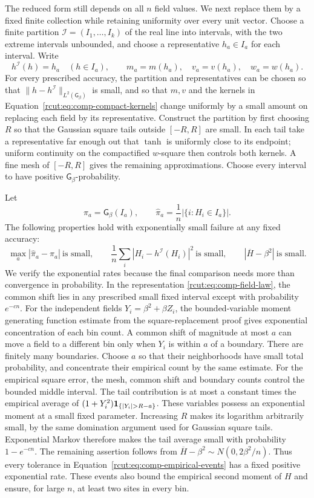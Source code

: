 The reduced form still depends on all $n$ field values.  We next
replace them by a fixed finite collection while retaining uniformity
over every unit vector.  Choose a finite partition
$\mathcal I=(I_1,\ldots,I_k)$ of the real line into intervals, with
the two extreme intervals unbounded, and choose a representative
$h_a\in I_a$ for each interval.  Write
\[
 h^{\mathcal I}(h)=h_a\quad(h\in I_a),\qquad
 m_a=m(h_a),\quad v_a=v(h_a),\quad w_a=w(h_a).
\]
For every prescribed accuracy, the partition and representatives can
be chosen so that $\|h-h^{\mathcal I}\|_{L^2(\mathsf G_\beta)}$ is
small, and so that $m,v$ and the kernels in
Equation~\eqref{rcut:eq:comp-compact-kernels} change uniformly by a
small amount on replacing each field by its representative.
Construct the partition by first choosing $R$ so that the Gaussian
square tails outside $[-R,R]$ are small.  In each tail take a
representative far enough out that $\tanh$ is uniformly close to its
endpoint; uniform continuity on the compactified $w$-square then
controls both kernels.  A fine mesh of $[-R,R]$ gives the remaining
approximations.  Choose every interval to have positive
$\mathsf G_\beta$-probability.

Let
\[
 \pi_a=\mathsf G_\beta(I_a),\qquad
 \widehat\pi_a=\frac1n|\{i:H_i\in I_a\}|.
\]
The following properties hold with exponentially small failure at
any fixed accuracy:
\begin{equation}
 \max_a|\widehat\pi_a-\pi_a|\ \text{is small},\qquad
 \frac1n\sum_i|H_i-h^{\mathcal I}(H_i)|^2\ \text{is small},
 \qquad |\overline H-\beta^2|\ \text{is small}.
 \label{rcut:eq:comp-empirical-events}
\end{equation}
We verify the exponential rates because the final comparison needs
more than convergence in probability.  In the representation
\eqref{rcut:eq:comp-field-law}, the common shift lies in any prescribed
small fixed interval except with probability $e^{-cn}$.  For the
independent fields $Y_i=\beta^2+\beta Z_i$, the bounded-variable
moment generating function estimate from the square-replacement proof
gives exponential concentration of each bin count.
A common shift of magnitude at most $a$ can move a field to a different
bin only when $Y_i$ is within $a$ of a boundary.  There are finitely
many boundaries.  Choose $a$ so that their neighborhoods have small
total probability, and concentrate their empirical count by the same
estimate.
For the empirical square error, the mesh, common shift and boundary
counts control the bounded middle interval.  The tail contribution
is at most a constant times the empirical average of
$(1+Y_i^2)\1_{\{|Y_i|>R-a\}}$.
These variables possess an exponential moment at a small fixed
parameter.  Increasing $R$ makes its logarithm arbitrarily small,
by the same domination argument used for Gaussian square tails.
Exponential Markov therefore makes the tail average small with
probability $1-e^{-cn}$.  The remaining assertion follows from
$\overline H-\beta^2\sim N(0,2\beta^2/n)$.
Thus every tolerance in Equation~\eqref{rcut:eq:comp-empirical-events}
has a fixed positive exponential rate.  These events also bound the
empirical second moment of $H$ and ensure, for large $n$, at least
two sites in every bin.

